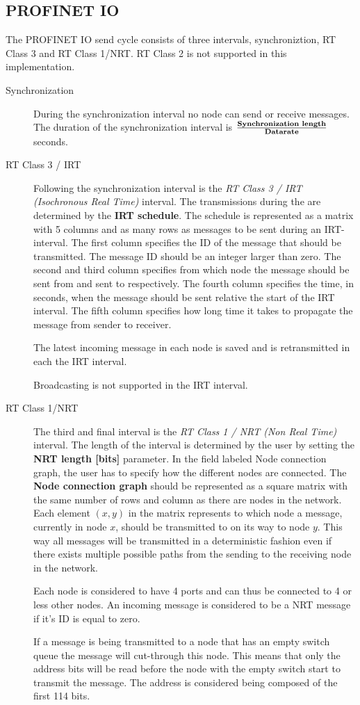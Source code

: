\documentclass[final,twoside]{rapport}
\begin{document}
\subsection{PROFINET IO}
The PROFINET IO send cycle consists of three intervals,
synchroniztion, RT Class 3 and RT Class 1/NRT. RT Class 2 is not
supported in this implementation. 

\begin{description}
\item[Synchronization] 
 During the synchronization interval no node can send or receive
 messages. The duration of the synchronization interval is
 $\frac{\text{\textbf{Synchronization
       length}}}{\text{\textbf{Datarate}}}$ seconds.

\item[RT Class 3 / IRT]
  Following the synchronization interval is the \emph{RT Class 3 / IRT
  (Isochronous Real Time)} interval. The transmissions during the are
  determined by the \textbf{IRT schedule}. The schedule is represented as a
  matrix with 5 columns and as many rows as messages to be sent during
  an IRT-interval. The first column specifies the ID of the message
  that should be transmitted. The message ID should be an integer
  larger than zero. The second and third column specifies from which
  node the message should be sent from and sent to respectively. The
  fourth column specifies the time, in seconds, when the message
  should be sent relative the start of the IRT interval. The fifth
  column specifies how long time it takes to propagate the message
  from sender to receiver.

  The latest incoming message in each node is saved and is retransmitted
  in each the IRT interval. 
  
  Broadcasting is not supported in the IRT interval.
\item[RT Class 1/NRT]
The third and final interval is the \emph{RT Class 1 / NRT (Non Real Time)}
interval. The length of the interval is determined by the user by
setting the \textbf{NRT length [bits]} parameter. In the field labeled Node
connection graph, the user has to specify how the different nodes are
connected. The \textbf{Node connection graph} should be represented as
a square matrix with the same number of rows and column as there are
nodes in the network. Each element $(x, y)$ in the matrix represents to
which node a message, currently in node $x$, should be transmitted to on
its way to node $y$. This way all messages will be transmitted in a
deterministic fashion even if there exists multiple possible paths
from the sending to the receiving node in the network.  

Each node is considered to have 4 ports and can thus be connected to 4
or less other nodes. An incoming message is considered to be a NRT
message if it's ID is equal to zero.

If a message is being transmitted to a node that has an empty switch
queue the message will cut-through this node. This means that only the
address bits will be read before the node with the empty switch start
to transmit the message. The address is considered being composed of
the first 114 bits. 
\end{description}
\end{document}
